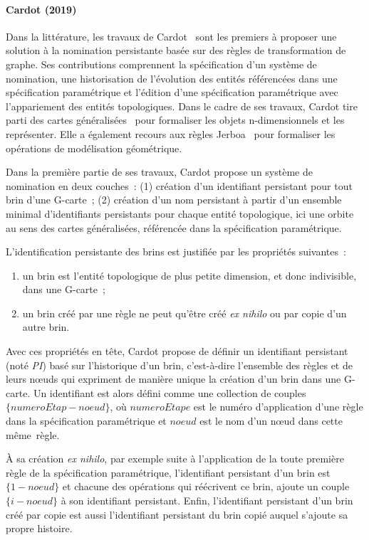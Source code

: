\paragraph*{Cardot (2019)}
\label{sec:etat-art-reevaluation-synthese-cardot}


Dans la littérature, les travaux de Cardot~\cite{cardot2019} sont les premiers à
proposer une solution à la nomination persistante basée sur des règles de
transformation de graphe. %
Ses contributions comprennent la spécification d'un système de nomination, une
historisation de l'évolution des entités référencées dans une spécification
paramétrique et l'édition d'une spécification paramétrique avec l'appariement
des entités topologiques. %
Dans le cadre de ses travaux, Cardot tire parti  des cartes
généralisées~\cite{lienhardt1994n,Damiand-Lienhardt14} pour formaliser les
objets n-dimensionnels et les représenter. %
Elle a également recours aux règles Jerboa~\cite{belhaouari2014jerboa} pour
formaliser les opérations de modélisation géométrique. %

Dans la première partie de ses travaux, Cardot propose un système de nomination
en deux couches~: (1) création d'un identifiant persistant pour tout brin d'une
G-carte~; (2) création d'un nom persistant à partir d'un ensemble
minimal d'identifiants persistants pour chaque entité topologique, ici
une orbite au sens des cartes généralisées, référencée dans la spécification
paramétrique.%

L'identification persistante des brins est justifiée par les propriétés
suivantes~:
\begin{enumerate}
	\item un brin est l'entité topologique de plus petite dimension, et donc
	      indivisible, dans une G-carte~;
	\item un brin créé par une règle ne peut qu'être créé \textit{ex nihilo} ou
	      par copie d'un autre brin. %
\end{enumerate}
Avec ces propriétés en tête, Cardot propose de définir un identifiant persistant
(noté \emph{PI}) basé sur l'historique d'un brin, c'est-à-dire l'ensemble des
règles et de leurs n\oe uds qui expriment de manière unique la création d'un
brin dans une G-carte. %
Un identifiant est alors défini comme une collection de couples
\(\{numeroEtap - noeud\}\), où \(numeroEtape\) est le numéro d'application d'une
règle dans la spécification paramétrique et \(noeud\) est le nom d'un n\oe ud
dans cette même~règle.%

À sa création \textit{ex nihilo}, par exemple suite à l'application de
la toute première règle de la spécification paramétrique, l'identifiant
persistant d'un brin est \(\{1 - noeud\}\) et chacune des opérations qui
réécrivent ce brin, ajoute un couple \(\{i - noeud\}\) à son identifiant
persistant. %
Enfin, l'identifiant persistant d'un brin créé par copie est aussi l'identifiant
persistant du brin copié auquel s'ajoute sa propre histoire. %



